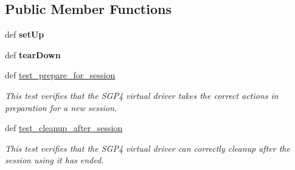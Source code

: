 \subsection*{Public Member Functions}
\begin{DoxyCompactItemize}
\item 
\hypertarget{classhwm_1_1hardware_1_1devices_1_1drivers_1_1sgp4__tracker_1_1tests_1_1test__sgp4__tracker_1_1_test_s_g_p4_tracker_a680d4595d618b5ac17e6cd2eacec53dd}{def {\bfseries set\-Up}}\label{classhwm_1_1hardware_1_1devices_1_1drivers_1_1sgp4__tracker_1_1tests_1_1test__sgp4__tracker_1_1_test_s_g_p4_tracker_a680d4595d618b5ac17e6cd2eacec53dd}

\item 
\hypertarget{classhwm_1_1hardware_1_1devices_1_1drivers_1_1sgp4__tracker_1_1tests_1_1test__sgp4__tracker_1_1_test_s_g_p4_tracker_ab18f1b42acf997814b529e41b27703eb}{def {\bfseries tear\-Down}}\label{classhwm_1_1hardware_1_1devices_1_1drivers_1_1sgp4__tracker_1_1tests_1_1test__sgp4__tracker_1_1_test_s_g_p4_tracker_ab18f1b42acf997814b529e41b27703eb}

\item 
\hypertarget{classhwm_1_1hardware_1_1devices_1_1drivers_1_1sgp4__tracker_1_1tests_1_1test__sgp4__tracker_1_1_test_s_g_p4_tracker_a27bff11a9a8839a7dd05aa9545ab40fc}{def \hyperlink{classhwm_1_1hardware_1_1devices_1_1drivers_1_1sgp4__tracker_1_1tests_1_1test__sgp4__tracker_1_1_test_s_g_p4_tracker_a27bff11a9a8839a7dd05aa9545ab40fc}{test\-\_\-prepare\-\_\-for\-\_\-session}}\label{classhwm_1_1hardware_1_1devices_1_1drivers_1_1sgp4__tracker_1_1tests_1_1test__sgp4__tracker_1_1_test_s_g_p4_tracker_a27bff11a9a8839a7dd05aa9545ab40fc}

\begin{DoxyCompactList}\small\item\em This test verifies that the S\-G\-P4 virtual driver takes the correct actions in preparation for a new session. \end{DoxyCompactList}\item 
def \hyperlink{classhwm_1_1hardware_1_1devices_1_1drivers_1_1sgp4__tracker_1_1tests_1_1test__sgp4__tracker_1_1_test_s_g_p4_tracker_a820f8979f5ceebe8ef2691c0471cee0d}{test\-\_\-cleanup\-\_\-after\-\_\-session}
\begin{DoxyCompactList}\small\item\em This test verifies that the S\-G\-P4 virtual driver can correctly cleanup after the session using it has ended. \end{DoxyCompactList}\end{DoxyCompactItemize}
